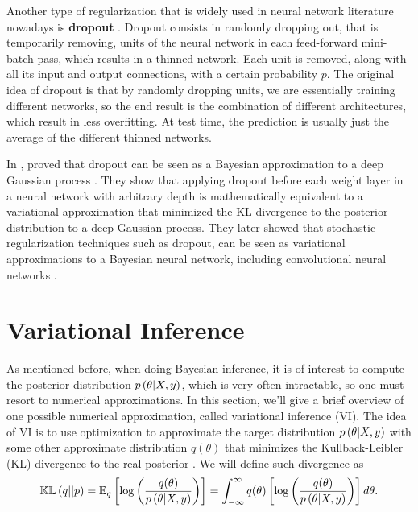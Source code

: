 Another type of regularization that is widely used in neural network literature nowadays is \textbf{dropout} \cite{srivastava2014dropout}. Dropout consists in randomly dropping out, that is temporarily removing, units of the neural network in each feed-forward mini-batch pass, which results in a thinned network. Each unit is removed, along with all its input and output connections, with a certain probability $p$. The original idea of dropout is that by randomly dropping units, we are essentially training different networks, so the end result is the combination of different architectures, which result in less overfitting. At test time, the prediction is usually just the average of the different thinned networks.

In \citeyear{gal2015dropout1}, \citeauthor{gal2015dropout1} proved that dropout can be seen as a Bayesian approximation to a deep Gaussian process \cite{gal2015dropout}. They show that applying dropout before each weight layer in a neural network with arbitrary depth is mathematically equivalent to a variational approximation that minimized the KL divergence to the posterior distribution to a deep Gaussian process. They later showed that stochastic regularization techniques such as dropout, can be seen as variational approximations to a Bayesian neural network, including convolutional neural networks \cite{gal2015bayesian} \cite{gal2015modern}.



\section{Variational Inference}

As mentioned before, when doing Bayesian inference, it is of interest to compute the posterior distribution $p\left( \theta | X, y \right)$, which is very often intractable, so one must resort to numerical approximations. In this section, we'll give a brief overview of one possible numerical approximation, called variational inference (VI). The idea of VI is to use optimization to approximate the target distribution $p\left( \theta | X, y \right)$ with some other approximate distribution $q(\theta)$ that minimizes the Kullback-Leibler (KL) divergence to the real posterior \cite{blei2017variational}. We will define such divergence as
\begin{equation}
  \label{eq:kl_divergence}
  \mathbb{KL}\left( q || p \right) = \mathbb{E}_q \left[ \log \left( \frac{q(\theta)}{p\left( \theta | X, y \right)} \right) \right] = \int_{-\infty}^{\infty} q(\theta) \left[ \log \left( \frac{q(\theta)}{p\left( \theta | X, y \right)} \right) \right] d\theta.
\end{equation}

